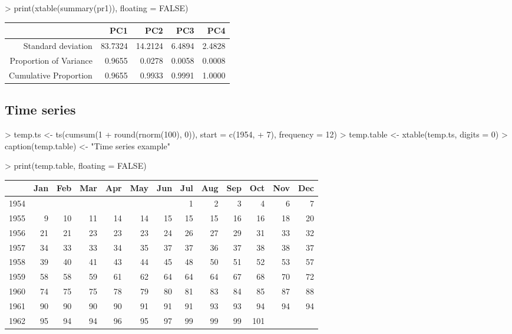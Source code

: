 \documentclass[letterpaper]{article}
\begin{document}
\begin{Schunk}
\begin{Sinput}
> print(xtable(summary(pr1)), floating = FALSE)
\end{Sinput}
% latex table generated in R 2.6.0 by xtable 1.5-2 package
% Wed Oct 10 14:26:36 2007
\begin{tabular}{rrrrr}
  \hline
 & PC1 & PC2 & PC3 & PC4 \\
  \hline
Standard deviation & 83.7324 & 14.2124 & 6.4894 & 2.4828 \\
  Proportion of Variance & 0.9655 & 0.0278 & 0.0058 & 0.0008 \\
  Cumulative Proportion & 0.9655 & 0.9933 & 0.9991 & 1.0000 \\
   \hline
\end{tabular}\end{Schunk}



\subsection{Time series}

\begin{Schunk}
\begin{Sinput}
> temp.ts <- ts(cumsum(1 + round(rnorm(100), 0)), start = c(1954, 
+     7), frequency = 12)
> temp.table <- xtable(temp.ts, digits = 0)
> caption(temp.table) <- "Time series example"
\end{Sinput}
\end{Schunk}
\begin{Schunk}
\begin{Sinput}
> print(temp.table, floating = FALSE)
\end{Sinput}
% latex table generated in R 2.6.0 by xtable 1.5-2 package
% Wed Oct 10 14:26:37 2007
\begin{tabular}{rrrrrrrrrrrrr}
  \hline
 & Jan & Feb & Mar & Apr & May & Jun & Jul & Aug & Sep & Oct & Nov & Dec \\
  \hline
1954 &  &  &  &  &  &  & 1 & 2 & 3 & 4 & 6 & 7 \\
  1955 & 9 & 10 & 11 & 14 & 14 & 15 & 15 & 15 & 16 & 16 & 18 & 20 \\
  1956 & 21 & 21 & 23 & 23 & 23 & 24 & 26 & 27 & 29 & 31 & 33 & 32 \\
  1957 & 34 & 33 & 33 & 34 & 35 & 37 & 37 & 36 & 37 & 38 & 38 & 37 \\
  1958 & 39 & 40 & 41 & 43 & 44 & 45 & 48 & 50 & 51 & 52 & 53 & 57 \\
  1959 & 58 & 58 & 59 & 61 & 62 & 64 & 64 & 64 & 67 & 68 & 70 & 72 \\
  1960 & 74 & 75 & 75 & 78 & 79 & 80 & 81 & 83 & 84 & 85 & 87 & 88 \\
  1961 & 90 & 90 & 90 & 90 & 91 & 91 & 91 & 93 & 93 & 94 & 94 & 94 \\
  1962 & 95 & 94 & 94 & 96 & 95 & 97 & 99 & 99 & 99 & 101 &  &  \\
   \hline
\end{tabular}\end{Schunk}
\end{document}

